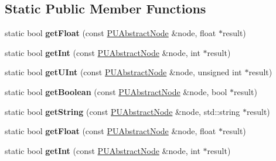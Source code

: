 \subsection*{Static Public Member Functions}
\begin{DoxyCompactItemize}
\item 
\mbox{\label{classPUScriptTranslator_a941f7951e06d30c7543a8eb137e9dcff}} 
static bool {\bfseries get\+Float} (const \hyperlink{classPUAbstractNode}{P\+U\+Abstract\+Node} \&node, float $\ast$result)
\item 
\mbox{\label{classPUScriptTranslator_ab7beff193c86dca1dfa6b8745d7604c0}} 
static bool {\bfseries get\+Int} (const \hyperlink{classPUAbstractNode}{P\+U\+Abstract\+Node} \&node, int $\ast$result)
\item 
\mbox{\label{classPUScriptTranslator_a4b5668c8d608510fdc1a78c3650ff635}} 
static bool {\bfseries get\+U\+Int} (const \hyperlink{classPUAbstractNode}{P\+U\+Abstract\+Node} \&node, unsigned int $\ast$result)
\item 
\mbox{\label{classPUScriptTranslator_a7bec2957a05eaa7adea30943638f151d}} 
static bool {\bfseries get\+Boolean} (const \hyperlink{classPUAbstractNode}{P\+U\+Abstract\+Node} \&node, bool $\ast$result)
\item 
\mbox{\label{classPUScriptTranslator_a61e42c79e19f46487a12d0cf2879755a}} 
static bool {\bfseries get\+String} (const \hyperlink{classPUAbstractNode}{P\+U\+Abstract\+Node} \&node, std\+::string $\ast$result)
\item 
\mbox{\label{classPUScriptTranslator_a9da11e38eb9e21ee162192492fe0ebc8}} 
static bool {\bfseries get\+Float} (const \hyperlink{classPUAbstractNode}{P\+U\+Abstract\+Node} \&node, float $\ast$result)
\item 
\mbox{\label{classPUScriptTranslator_a904861a4deb2ec44bf91a349029674fe}} 
static bool {\bfseries get\+Int} (const \hyperlink{classPUAbstractNode}{P\+U\+Abstract\+Node} \&node, int $\ast$result)
\item 
\mbox{\label{classPUScriptTranslator_ad24a1eafce3cc1ca62d45e737701335b}} 

\end{DoxyCompactItemize}
